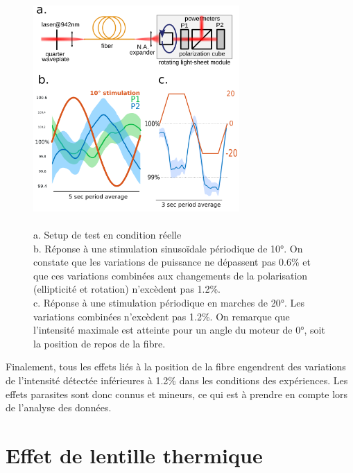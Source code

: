\begin{figure}
\centering
\includegraphics[width=0.7\textwidth]{./files/real-condition_intensity-variation.png}
\caption{
\\ a. Setup de test en condition réelle
\\ b. Réponse à une stimulation sinusoïdale périodique de 10°. On constate que les variations de puissance ne dépassent pas 0.6\% et que ces variations combinées aux changements de la polarisation (ellipticité et rotation) n'excèdent pas 1.2\%.
\\ c. Réponse à une stimulation périodique en marches de 20°. Les variations combinées n'excèdent pas 1.2\%. On remarque que l'intensité maximale est atteinte pour un angle du moteur de 0°, soit la position de repos de la fibre.
\label{FIGrealconditionsfiber}}
\end{figure}

Finalement, tous les effets liés à la position de la fibre engendrent des variations de l'intensité détectée inférieures à 1.2\% dans les conditions des expériences. Les effets parasites sont donc connus et mineurs, ce qui est à prendre en compte lors de l'analyse des données.




\section{Effet de lentille thermique}

